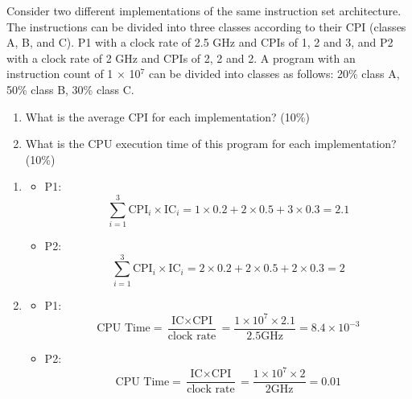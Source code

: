 \documentclass[12pt, a4paper]{article}
\begin{document}
\begin{q}{20}
    Consider two different implementations of the same instruction set architecture. The
instructions can be divided into three classes according to their CPI (classes A, B, and
C). P1 with a clock rate of 2.5 GHz and CPIs of 1, 2 and 3, and P2 with a clock rate of
2 GHz and CPIs of 2, 2 and 2. A program with an instruction count of 1 × 10$^7$ can be
divided into classes as follows: 20\% class A, 50\% class B, 30\% class C. 
\begin{enumerate}
    \item What is the average CPI for each implementation? (10\%)
    \item What is the CPU execution time of this program for each implementation? (10\%)
\end{enumerate}
\end{q}
\begin{ans}
\begin{enumerate}
    \item 
    \begin{itemize}
        \item P1: $$\sum_{i=1}^{3}\text{CPI}_i\times\text{IC}_i = 1\times0.2+2\times0.5+3\times0.3=2.1$$
        \item P2: $$\sum_{i=1}^{3}\text{CPI}_i\times\text{IC}_i = 2\times0.2+2\times0.5+2\times0.3=2$$
    \end{itemize}
    \item 
    \begin{itemize}
        \item P1: $$\text{CPU Time}=\frac{\text{IC}\times\text{CPI}}{\text{clock rate}}=\frac{1\times10^7\times2.1}{2.5\text{GHz}}=8.4\times10^{-3}$$
        \item P2: $$\text{CPU Time}=\frac{\text{IC}\times\text{CPI}}{\text{clock rate}}=\frac{1\times10^7\times2}{2\text{GHz}}=0.01$$
    \end{itemize}
\end{enumerate}
\end{ans}
\pagebreak
\end{document}
